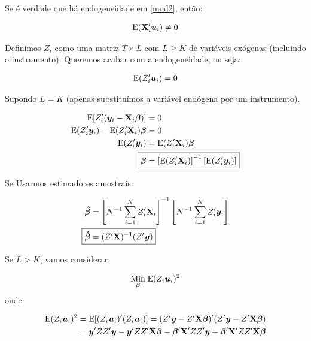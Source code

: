 \documentclass[11pt, oneside, a4paper, article]{article}
\numberwithin{equation}{section}
\begin{document}
Se é verdade que há endogeneidade em \eqref{mod2}, então:

\vspace{-1 em}
\begin{align*}
	\text{E}(\mathbf{X}_{i}^{\prime} \boldsymbol{u}_{i}) \neq 0
\end{align*}

Definimos $Z_{i}$ como uma matriz $T \times L$ com $L \geq K$ de variáveis exógenas (incluindo o instrumento).
Queremos acabar com a endogeneidade, ou seja:

\vspace{-1 em}
\begin{align*}
	\text{E}(Z_{i}^{\prime} \boldsymbol{u}_{i}) = 0
\end{align*}

Supondo $L = K$ (apenas substituímos a variável endógena por um instrumento).

\vspace{-1 em}
\begin{align*}
\E[ Z_{i}^{\prime} ( \mbs{y}_{i} - \Xmat_{i} \mbs{\beta} ) ] &= 0
\\
\E( Z_{i}^{\prime} \mbs{y}_{i} ) - \E( Z_{i}^{\prime} \Xmat_{i} ) \mbs{\beta} &= 0
\\
\E( Z_{i}^{\prime} \mbs{y}_{i} ) &= \E( Z_{i}^{\prime} \Xmat_{i} ) \mbs{\beta}
\\
\Aboxed{
\mbs{\beta} &=
\left[ \E( Z_{i}^{\prime} \Xmat_{i} ) \right]^{-1}
\left[ \E( Z_{i}^{\prime} \mbs{y}_{i} ) \right]
}
\end{align*}

Se Usarmos estimadores amostrais:

\vspace{-1 em}
\begin{align*}
\mbs{\hat{\beta}} &=
\left[ N^{-1} \sum_{i=1}^{N} Z_{i}^{\prime} \Xmat_{i} \right]^{-1}
\left[ N^{-1} \sum_{i=1}^{N} Z_{i}^{\prime} \mbs{y}_{i} \right]
\\
\Aboxed{
\mbs{\hat{\beta}} &=
( Z^{\prime} \Xmat )^{-1} ( Z^{\prime} \mbs{y} ) }
\end{align*}

\vspace{1 em}
Se $L > K$, vamos considerar:

\vspace{-1 em}
\begin{align*}
\underset{\boldsymbol{\beta}}{\text{Min}} \;
\text{E}( Z_{i}\boldsymbol{u}_{i} )^2
\end{align*}
\noindent onde:

\vspace{-1 em}
\begin{align*}
\text{E}( Z_{i}\boldsymbol{u}_{i} )^2 
&=
\text{E}[ ( Z_{i}\boldsymbol{u}_{i} )' ( Z_{i}\boldsymbol{u}_{i} ) ]
=
( Z' \boldsymbol{y} - Z' \mathbf{X} \boldsymbol{\beta} )' ( Z' \boldsymbol{y} - Z' \mathbf{X} \boldsymbol{\beta} )
\\
&=
\boldsymbol{y}' ZZ' \boldsymbol{y}
-
\boldsymbol{y}' ZZ' \mathbf{X} \boldsymbol{\beta}
-
\boldsymbol{\beta}' \mathbf{X}' ZZ' \boldsymbol{y}
+
\boldsymbol{\beta}' \mathbf{X}' ZZ' \mathbf{X} \boldsymbol{\beta}
\end{align*}
\end{document}
